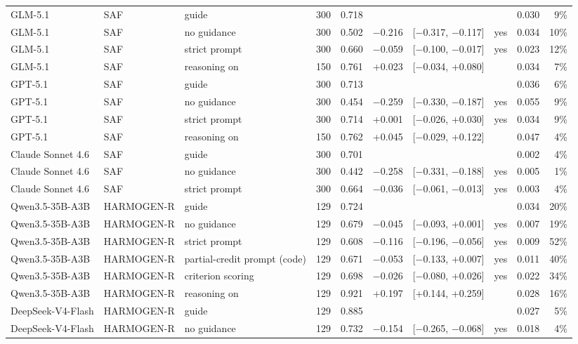\documentclass[10pt]{article}
\begin{document}
\begin{longtable}{ll>{\raggedright\arraybackslash}p{2.9cm}rrrlclr}
GLM-5.1 & SAF & guide & 300 & 0.718 &  &  &  & 0.030 & 9\% \\
GLM-5.1 & SAF & no guidance & 300 & 0.502 & $-$0.216 & [$-$0.317, $-$0.117] & yes & 0.034 & 10\% \\
GLM-5.1 & SAF & strict prompt & 300 & 0.660 & $-$0.059 & [$-$0.100, $-$0.017] & yes & 0.023 & 12\% \\
GLM-5.1 & SAF & reasoning on & 150 & 0.761 & +0.023 & [$-$0.034, +0.080] &  & 0.034 & 7\% \\
GPT-5.1 & SAF & guide & 300 & 0.713 &  &  &  & 0.036 & 6\% \\
GPT-5.1 & SAF & no guidance & 300 & 0.454 & $-$0.259 & [$-$0.330, $-$0.187] & yes & 0.055 & 9\% \\
GPT-5.1 & SAF & strict prompt & 300 & 0.714 & +0.001 & [$-$0.026, +0.030] & yes & 0.034 & 9\% \\
GPT-5.1 & SAF & reasoning on & 150 & 0.762 & +0.045 & [$-$0.029, +0.122] &  & 0.047 & 4\% \\
Claude Sonnet 4.6 & SAF & guide & 300 & 0.701 &  &  &  & 0.002 & 4\% \\
Claude Sonnet 4.6 & SAF & no guidance & 300 & 0.442 & $-$0.258 & [$-$0.331, $-$0.188] & yes & 0.005 & 1\% \\
Claude Sonnet 4.6 & SAF & strict prompt & 300 & 0.664 & $-$0.036 & [$-$0.061, $-$0.013] & yes & 0.003 & 4\% \\
Qwen3.5-35B-A3B & HARMOGEN-R & guide & 129 & 0.724 &  &  &  & 0.034 & 20\% \\
Qwen3.5-35B-A3B & HARMOGEN-R & no guidance & 129 & 0.679 & $-$0.045 & [$-$0.093, +0.001] & yes & 0.007 & 19\% \\
Qwen3.5-35B-A3B & HARMOGEN-R & strict prompt & 129 & 0.608 & $-$0.116 & [$-$0.196, $-$0.056] & yes & 0.009 & 52\% \\
Qwen3.5-35B-A3B & HARMOGEN-R & partial-credit prompt (code) & 129 & 0.671 & $-$0.053 & [$-$0.133, +0.007] & yes & 0.011 & 40\% \\
Qwen3.5-35B-A3B & HARMOGEN-R & criterion scoring & 129 & 0.698 & $-$0.026 & [$-$0.080, +0.026] & yes & 0.022 & 34\% \\
Qwen3.5-35B-A3B & HARMOGEN-R & reasoning on & 129 & 0.921 & +0.197 & [+0.144, +0.259] &  & 0.028 & 16\% \\
DeepSeek-V4-Flash & HARMOGEN-R & guide & 129 & 0.885 &  &  &  & 0.027 & 5\% \\
DeepSeek-V4-Flash & HARMOGEN-R & no guidance & 129 & 0.732 & $-$0.154 & [$-$0.265, $-$0.068] & yes & 0.018 & 4\% \\

\end{longtable}
\end{document}
